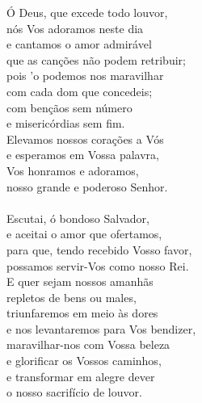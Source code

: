 \documentclass[10pt,a4]{article}
\begin{document}
\begin{paracol}{2}
\switchcolumn

\'O Deus, que excede todo louvor,\\
n\'os Vos adoramos neste dia\\
e cantamos o amor admir\'avel \\
que as can\c{c}\~oes n\~ao podem retribuir;\\
pois 'o podemos nos maravilhar \\
com cada dom que concedeis;\\
com ben\c{c}\~aos sem n\'umero \\
e miseric\'ordias sem fim.\\
Elevamos nossos cora\c{c}\~oes a V\'os\\
e esperamos em Vossa palavra,\\
Vos honramos e adoramos,\\
nosso grande e poderoso Senhor.\\
\\
Escutai, \'o bondoso Salvador, \\
e aceitai o amor que ofertamos,\\
para que, tendo recebido Vosso favor,\\
possamos servir-Vos como nosso Rei.\\
E quer sejam nossos amanh\~as \\
repletos de bens ou males,\\
triunfaremos em meio \`as dores \\
e nos levantaremos para Vos bendizer,\\
maravilhar-nos com Vossa beleza \\
e glorificar os Vossos caminhos,\\
e transformar em alegre dever \\
o nosso sacrif\'icio de louvor.

\switchcolumn*

\end{paracol}


%
\end{document}
